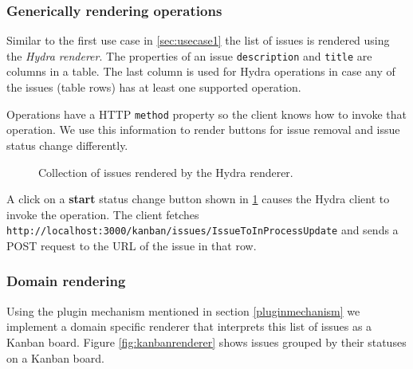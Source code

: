 \subsubsection{Generically rendering operations}
Similar to the first use case in \ref{sec:usecase1} the list of issues is rendered using the \textit{Hydra renderer}. The properties of an issue \lstinline{description} and \lstinline{title} are columns in a table. The last column is used for Hydra operations in case any of the issues (table rows) has at least one supported operation.

Operations have a HTTP \lstinline{method} property so the client knows how to invoke that operation. We use this information to render buttons for issue removal and issue status change differently.

\begin{figure}[!htb]
  \caption{Collection of issues rendered by the Hydra renderer.}
  \label{fig:issueshydra}
\end{figure}

A click on a \textbf{start} status change button shown in \ref{fig:issueshydra} causes the Hydra client to invoke the operation. The client fetches \lstinline{http://localhost:3000/kanban/issues/IssueToInProcessUpdate} and sends a POST request to the URL of the issue in that row.

\subsubsection{Domain rendering}
Using the plugin mechanism mentioned in section \ref{pluginmechanism} we implement a domain specific renderer that interprets this list of issues as a Kanban board. Figure \ref{fig:kanbanrenderer} shows issues grouped by their statuses on a Kanban board.

